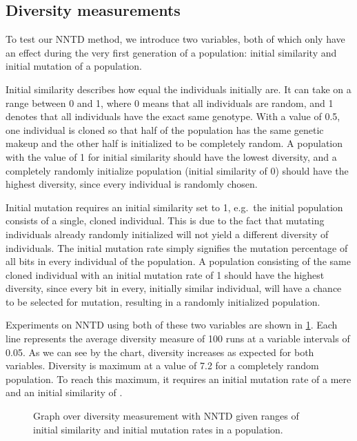 \subsection{Diversity measurements}
To test our NNTD method, we introduce two variables, both of which only have an effect during the very first generation of a population: initial similarity and initial mutation of a population. 

Initial similarity describes how equal the individuals initially are. It can take on a range between \num{0} and \num{1}, where \num{0} means that all individuals are random, and \num{1} denotes that  all individuals have the exact same genotype. With a value of \num{0.5}, one individual is cloned so that half of the population has the same genetic makeup and the other half is initialized to be completely random. A population with the value of \num{1} for initial similarity should have the lowest diversity, and a completely randomly initialize population (initial similarity of \num{0}) should have the highest diversity, since every individual is randomly chosen.

Initial mutation requires an initial similarity set to \num{1}, e.g.\ the initial population consists of a single, cloned individual. This is due to the fact that mutating individuals already randomly initialized will not yield a different diversity of individuals. The initial mutation rate simply signifies the mutation percentage of all bits in every individual of the population. A population consisting of the same cloned individual with an initial mutation rate of \num{1} should have the highest diversity, since every bit in every, initially similar individual, will have a  chance to be selected for mutation, resulting in a randomly initialized population.

Experiments on NNTD using both of these two variables are shown in \cref{fig:initial-mutation-similarity}. Each line represents the average diversity measure of \num{100} runs at a variable intervals of \num{0.05}. As we can see by the chart, diversity increases as expected for both variables. Diversity is maximum at a value of \num{7.2} for a completely random population. To reach this maximum, it requires an initial mutation rate of a mere  and an initial similarity of .


\begin{figure}[htpb]
  \centering
  \caption{Graph over diversity measurement with NNTD given ranges of initial similarity and initial mutation rates in a population.}\label{fig:initial-mutation-similarity}
\end{figure}
